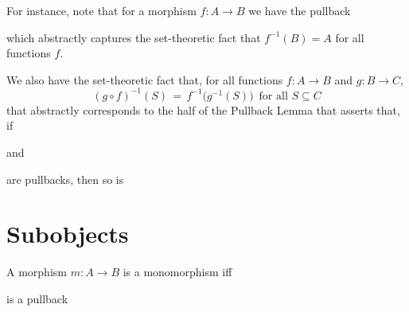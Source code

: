\begin{remark}
For instance, note that for a morphism $f: A \to B$ we have the pullback
\begin{center}
\end{center}
which abstractly captures the set-theoretic fact that $f^{-1}(B) = A$ for all
functions $f$.

We also have the set-theoretic fact that, for all functions $f:A\to B$ and
$g:B\to C$, 
\[
  (g \circ f)^{-1}(S) 
  \,=\,
  f^{-1}\big(g^{-1}(S)\big) 
  \enspace\text{for all $S\subseteq C$}
\]
that abstractly corresponds to the half of the Pullback Lemma that asserts
that, if 
\begin{center}
\qquad and \qquad
{}
\end{center}
are pullbacks, then so is
\begin{center}
\end{center}
\end{remark}

\section{Subobjects}

\begin{proposition}
A morphism $m: A \to B$ is a monomorphism iff 
\begin{center}
\end{center}
is a pullback
\end{proposition}

